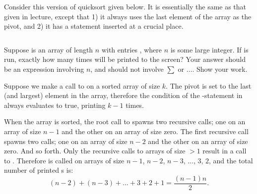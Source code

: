\begin{prob}
    Consider this version of quicksort given below. It is essentially the same
    as that given in lecture, except that 1) it always uses the last element of the
    array as the pivot, and 2) it has a  statement inserted at
    a crucial place.

    \inputminted{python}{\thisdir/include/quicksort.py}

    Suppose  is an array of length $n$ with entries
    \python{[1, 2, 3, ..., n]}, where $n$ is some large integer.  If
     is run, exactly how many times
    will
     be printed to the screen? Your answer should be an expression
    involving $n$, and should not involve $\sum$ or $\ldots$. Show your work.

    \begin{soln}
        Suppose we make a call to  on a sorted array of size $k$.
        The pivot is set to the last (and largest) element in the array, therefore
        the condition of the -statement in  always
        evaluates to true, printing  $k - 1$ times. 

        When the array is sorted, the root call to  spawns
        two recursive calls; one on an array of size $n - 1$ and the other on
        an array of size zero. The first recursive call spawns two calls; one
        on an array of size $n - 2$ and the other on an array of size zero. And
        so forth. Only the recursive calls to arrays of size $> 1$ result in a call
        to . Therefore  is called on arrays
        of size $n-1$, $n-2$, $n-3$, $\ldots$, $3$, $2$, and the total number
        of printed s is:
        \[
            (n-2) + (n-3) + \ldots + 3 + 2 + 1 = \frac{(n-1)n}{2}.
        \]
    \end{soln}

\end{prob}
